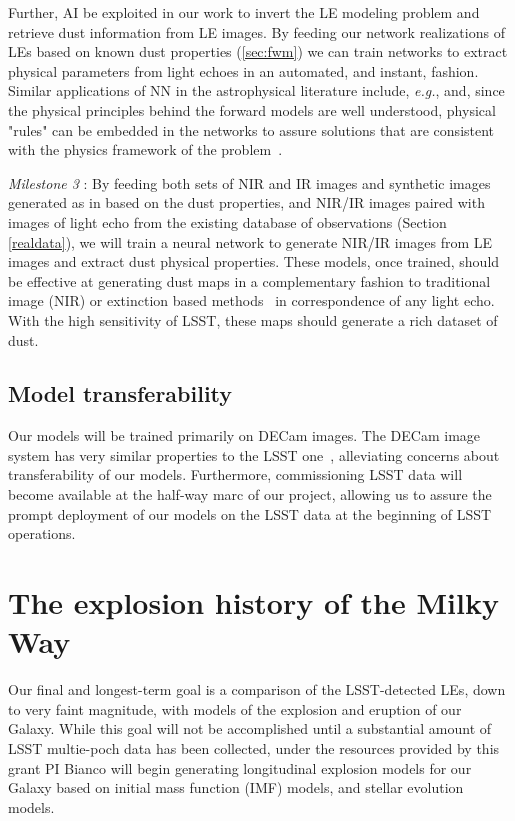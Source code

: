 \documentclass{proposalnsf}
\newcommand{\eg}{\emph{e.g.}}
\begin{document}
Further, AI be exploited in our work to invert the LE modeling problem and retrieve dust information from LE images. By feeding our network realizations of LEs based on known dust properties (\autoref{sec:fwm}) we can train networks to extract physical parameters from light echoes in an automated, and instant, fashion. Similar applications of NN in the astrophysical literature include, \eg \citep{chen2019}, and, since the physical principles behind the forward models are well understood, physical "rules" can be embedded in the networks to assure solutions that are consistent with the physics framework of the problem~\citep{mattheakis2019}. 

\emph{Milestone 3} : By feeding both sets of NIR and IR images and synthetic images generated as in  based on the dust properties, and NIR/IR images paired with images of light echo from the existing database of observations (Section \autoref{realdata}), we will train a neural network to generate NIR/IR images from LE images and extract dust physical properties. These models, once trained, should be effective at generating dust maps in a complementary fashion to traditional image (NIR) or extinction based methods~\citep{schafly11} in correspondence of any light echo. With the high sensitivity of LSST, these maps should generate a rich dataset of dust.

\subsection{Model transferability}
Our models will be trained primarily on DECam images. The DECam image system has very similar properties to the LSST one~\citep{2016SPIE.9906E..4JX}, alleviating concerns about transferability of our models. Furthermore, commissioning LSST data will become available at the half-way marc of our project, allowing us to assure the prompt deployment of our models on the LSST data at the beginning of LSST operations. 

\section{The explosion history of the Milky Way}
Our final and longest-term goal is a comparison of the LSST-detected LEs, down to very faint magnitude, with models of the explosion and eruption of our Galaxy. While this goal will not be accomplished until a substantial amount of LSST multie-poch data has been collected, under the resources provided by this grant PI Bianco will begin generating longitudinal explosion models for our Galaxy based on initial mass function (IMF) models, and stellar evolution models. 
\end{document}
